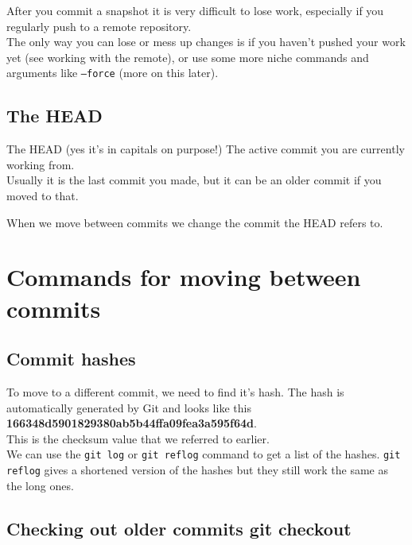 After you commit a snapshot it is very difficult to lose work, especially if you regularly push to a remote repository.
\\

The only way you can lose or mess up changes is if you haven’t pushed your work yet (see working with the remote), or use some more niche commands and arguments like \texttt{--force} (more on this later).
\\

\subsection{The HEAD}

\begin{infobox}{The HEAD (yes it's in capitals on purpose!)}
	The active commit you are currently working from. 
	\\
	
	Usually it is the last commit you made, but it can be an older commit if you moved to that.
\end{infobox}

When we move between commits we change the commit the HEAD refers to.
\\


\section{Commands for moving between commits}

\subsection{Commit hashes}

To move to a different commit, we need to find it's hash. The hash is automatically generated by Git and looks like this \textbf{166348d5901829380ab5b44ffa09fea3a595f64d}. 
\\

This is the checksum value that we referred to earlier.
\\

We can use the \texttt{git log} or \texttt{git reflog} command to get a list of the hashes. \texttt{git reflog} gives a shortened version of the hashes but they still work the same as the long ones.
\\

\subsection{Checking out older commits git checkout}

